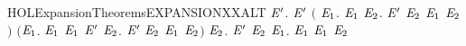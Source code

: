 \newcommand{\HOLExpansionTheoremsexpandsXXWEAKXXTRANSXXtau}{\UseVerbatim{HOLExpansionTheoremsexpandsXXWEAKXXTRANSXXtau}}
\begin{SaveVerbatim}{HOLExpansionTheoremsEXPANSIONXXALT}
\HOLTokenTurnstile{}   \HOLSymConst{\HOLTokenEquiv{}}
   \HOLSymConst{\HOLTokenForall{}} \ensuremath{\HOLBoundVar{E}\sp{\prime}}.
         \ensuremath{\HOLBoundVar{E}\sp{\prime}} \HOLSymConst{\HOLTokenImp{}}
       \ensuremath{(}\HOLSymConst{\HOLTokenForall{}} \ensuremath{\HOLBoundVar{E}\sb{\mathrm{1}}}.  \HOLTokenTransBegin{} \HOLTokenTransEnd \ensuremath{\HOLBoundVar{E}\sb{\mathrm{1}}} \HOLSymConst{\HOLTokenImp{}} \HOLSymConst{\HOLTokenExists{}}\ensuremath{\HOLBoundVar{E}\sb{\mathrm{2}}}. \ensuremath{\HOLBoundVar{E}\sp{\prime}} \HOLTokenTransBegin{} \HOLTokenTransEnd \ensuremath{\HOLBoundVar{E}\sb{\mathrm{2}}} \HOLSymConst{\HOLTokenConj{}}  \ensuremath{\HOLBoundVar{E}\sb{\mathrm{1}}} \ensuremath{\HOLBoundVar{E}\sb{\mathrm{2}}}\ensuremath{)} \HOLSymConst{\HOLTokenConj{}}
       \ensuremath{(}\HOLSymConst{\HOLTokenForall{}}\ensuremath{\HOLBoundVar{E}\sb{\mathrm{1}}}.  \HOLTokenTransBegin\HOLConst{\ensuremath{\tau}}\HOLTokenTransEnd \ensuremath{\HOLBoundVar{E}\sb{\mathrm{1}}} \HOLSymConst{\HOLTokenImp{}}  \ensuremath{\HOLBoundVar{E}\sb{\mathrm{1}}} \ensuremath{\HOLBoundVar{E}\sp{\prime}} \HOLSymConst{\HOLTokenDisj{}} \HOLSymConst{\HOLTokenExists{}}\ensuremath{\HOLBoundVar{E}\sb{\mathrm{2}}}. \ensuremath{\HOLBoundVar{E}\sp{\prime}} \HOLTokenTransBegin\HOLConst{\ensuremath{\tau}}\HOLTokenTransEnd \ensuremath{\HOLBoundVar{E}\sb{\mathrm{2}}} \HOLSymConst{\HOLTokenConj{}}  \ensuremath{\HOLBoundVar{E}\sb{\mathrm{1}}} \ensuremath{\HOLBoundVar{E}\sb{\mathrm{2}}}\ensuremath{)} \HOLSymConst{\HOLTokenConj{}}
       \HOLSymConst{\HOLTokenForall{}} \ensuremath{\HOLBoundVar{E}\sb{\mathrm{2}}}. \ensuremath{\HOLBoundVar{E}\sp{\prime}} \HOLTokenTransBegin{}\HOLTokenTransEnd \ensuremath{\HOLBoundVar{E}\sb{\mathrm{2}}} \HOLSymConst{\HOLTokenImp{}} \HOLSymConst{\HOLTokenExists{}}\ensuremath{\HOLBoundVar{E}\sb{\mathrm{1}}}.  \HOLTokenWeakTransBegin{}\HOLTokenWeakTransEnd \ensuremath{\HOLBoundVar{E}\sb{\mathrm{1}}} \HOLSymConst{\HOLTokenConj{}}  \ensuremath{\HOLBoundVar{E}\sb{\mathrm{1}}} \ensuremath{\HOLBoundVar{E}\sb{\mathrm{2}}}
\end{SaveVerbatim}
